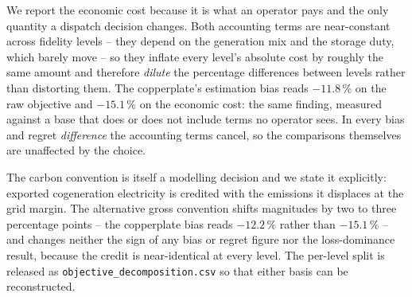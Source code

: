 We report the economic cost because it is what an operator pays and the only quantity a
dispatch decision changes. Both accounting terms are near-constant across fidelity levels
-- they depend on the generation mix and the storage duty, which barely move -- so they
inflate every level's absolute cost by roughly the same amount and therefore \emph{dilute}
the percentage differences between levels rather than distorting them. The copperplate's
estimation bias reads $-11.8$\,\% on the raw objective and $\mathbf{-15.1}$\,\% on the
economic cost: the same finding, measured against a base that does or does not include
terms no operator sees. In every bias and regret \emph{difference} the accounting terms
cancel, so the comparisons themselves are unaffected by the choice.

The carbon convention is itself a modelling decision and we state it explicitly: exported
cogeneration electricity is credited with the emissions it displaces at the grid margin.
The alternative gross convention shifts magnitudes by two to three percentage points --
the copperplate bias reads $-12.2$\,\% rather than $-15.1$\,\% -- and changes neither the
sign of any bias or regret figure nor the loss-dominance result, because the credit is
near-identical at every level. The per-level split is released as
\texttt{objective\_decomposition.csv} so that either basis can be reconstructed.
